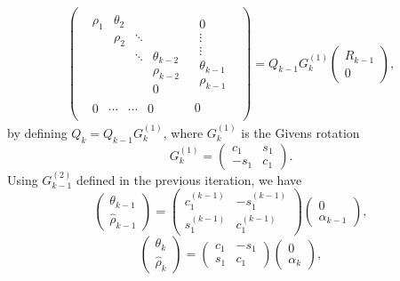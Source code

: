\documentclass[11pt]{article}
\begin{document}
\begin{eqnarray*}
\begin{pmatrix}\begin{array}{c|c}
\begin{matrix}
 \rho_1    & \theta_2 &         &      \\
            & \rho_2   & \ddots  &      \\
            &          & \ddots  & \theta_{k-2}     \\
            &          &         & \rho_{k-2} \\
		        &          &         & 0 
 \end{matrix}
&  \begin{matrix} 0 \\ \vdots \\ \vdots \\ \theta_{k-1} \\ \rho_{k-1} \end{matrix} \\
\hline
\begin{matrix} 0 & \cdots  & \cdots & 0  \end{matrix} & 0
\end{array}\end{pmatrix} = Q_{k-1} G^{(1)}_k
\begin{pmatrix}
R_{k-1} \\
\hline
0 \end{pmatrix},
\end{eqnarray*}
by defining $Q_k = Q_{k-1}G^{(1)}_k$, where $G^{(1)}_k$ is the Givens rotation
$$G^{(1)}_k = \begin{pmatrix}
c_1 & s_1 \\
-s_1 & c_1
\end{pmatrix}. $$
Using $G^{(2)}_{k-1}$ defined in the previous iteration, we have
\[ \begin{pmatrix} \theta_{k-1} \\ \hat{\rho}_{k-1} \end{pmatrix}
= \begin{pmatrix}  
c^{(k-1)}_1 & -s^{(k-1)}_1 \\
s^{(k-1)}_1 & c^{(k-1)}_1 \end{pmatrix}
\begin{pmatrix} 0 \\ \alpha_{k-1} \end{pmatrix},
\]
\[
\begin{pmatrix} \theta_{k} \\ \hat{\rho}_{k} \end{pmatrix}
= \begin{pmatrix}  c_1 & -s_1 \\ s_1 & c_1 \end{pmatrix}
\begin{pmatrix} 0 \\ \alpha_{k} \end{pmatrix},
\]
\end{document}
